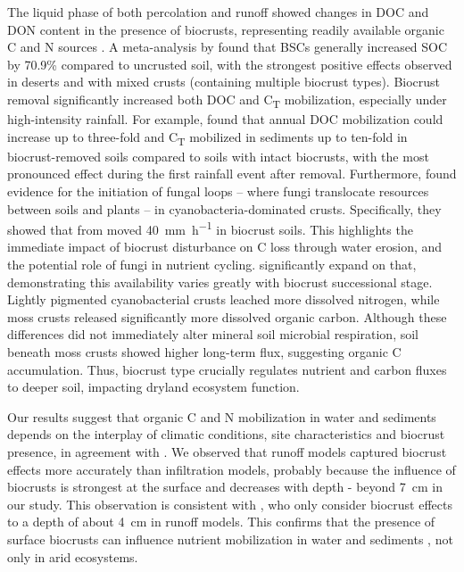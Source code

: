 The liquid phase of both percolation and runoff showed changes in DOC and DON content in the presence of biocrusts, representing readily available organic C and N sources \citep{Bernal2005}. A meta-analysis by \citet{Xu2022} found that BSCs generally increased SOC by 70.9\% compared to uncrusted soil, with the strongest positive effects observed in deserts and with mixed crusts (containing multiple biocrust types). Biocrust removal significantly increased both DOC and C\textsubscript{T} mobilization, especially under high-intensity rainfall. For example, \citet{Chamizo2017} found that annual DOC mobilization could increase up to three-fold and C\textsubscript{T} mobilized in sediments up to ten-fold in biocrust-removed soils compared to soils with intact biocrusts, with the most pronounced effect during the first rainfall event after removal. Furthermore, \citet{Aanderud2018} found evidence for the initiation of fungal loops -- where fungi translocate resources between soils and plants -- in cyanobacteria-dominated crusts. Specifically, they showed that  from  moved \SI{40}{\milli\metre\per\hour} in biocrust soils. This highlights the immediate impact of biocrust disturbance on C loss through water erosion, and the potential role of fungi in nutrient cycling. \citet{Young2022} significantly expand on that, demonstrating this availability varies greatly with biocrust successional stage. Lightly pigmented cyanobacterial crusts leached more dissolved nitrogen, while moss crusts released significantly more dissolved organic carbon. Although these differences did not immediately alter mineral soil microbial respiration, soil beneath moss crusts showed higher long-term  flux, suggesting organic C accumulation. Thus, biocrust type crucially regulates nutrient and carbon fluxes to deeper soil, impacting dryland ecosystem function.

Our results suggest that organic C and N mobilization in water and sediments depends on the interplay of climatic conditions, site characteristics and biocrust presence, in agreement with \citet{Austin2004}. We observed that runoff models captured biocrust effects more accurately than infiltration models, probably because the influence of biocrusts is strongest at the surface and decreases with depth - beyond \SI{7}{\centi\meter} in our study. This observation is consistent with \citet{Williams2022}, who only consider biocrust effects to a depth of about \SI{4}{\centi\meter} in runoff models. This confirms that the presence of surface biocrusts can influence nutrient mobilization in water and sediments \citep{Belnap2003,RodriguezCaballero2013}, not only in arid ecosystems.

